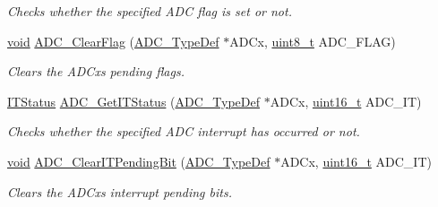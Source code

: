 \begin{DoxyCompactItemize}
\begin{DoxyCompactList}\small\item\em Checks whether the specified A\+DC flag is set or not. \end{DoxyCompactList}\item 
\hyperlink{usb__devapi_8h_afabf60e7f57651d6d595a02c75f07cd0}{void} \hyperlink{group___a_d_c___exported___functions_gaf34f36798f811b4a41321ea2d12118d4}{A\+D\+C\+\_\+\+Clear\+Flag} (\hyperlink{struct_a_d_c___type_def}{A\+D\+C\+\_\+\+Type\+Def} $\ast$A\+D\+Cx, \hyperlink{_p_e___types_8h_aba7bc1797add20fe3efdf37ced1182c5}{uint8\+\_\+t} A\+D\+C\+\_\+\+F\+L\+AG)
\begin{DoxyCompactList}\small\item\em Clears the A\+D\+Cx\textquotesingle{}s pending flags. \end{DoxyCompactList}\item 
\hyperlink{agilefox_2library_2inc_2stm32f10x__type_8h_aacbd7ed539db0aacd973a0f6eca34074}{I\+T\+Status} \hyperlink{group___a_d_c___exported___functions_gaa1d3b910a83dbf14d4f68c8eef058612}{A\+D\+C\+\_\+\+Get\+I\+T\+Status} (\hyperlink{struct_a_d_c___type_def}{A\+D\+C\+\_\+\+Type\+Def} $\ast$A\+D\+Cx, \hyperlink{_p_e___types_8h_a1f1825b69244eb3ad2c7165ddc99c956}{uint16\+\_\+t} A\+D\+C\+\_\+\+IT)
\begin{DoxyCompactList}\small\item\em Checks whether the specified A\+DC interrupt has occurred or not. \end{DoxyCompactList}\item 
\hyperlink{usb__devapi_8h_afabf60e7f57651d6d595a02c75f07cd0}{void} \hyperlink{group___a_d_c___exported___functions_ga601c6a67bd883eb631ecc7aa5e999b9c}{A\+D\+C\+\_\+\+Clear\+I\+T\+Pending\+Bit} (\hyperlink{struct_a_d_c___type_def}{A\+D\+C\+\_\+\+Type\+Def} $\ast$A\+D\+Cx, \hyperlink{_p_e___types_8h_a1f1825b69244eb3ad2c7165ddc99c956}{uint16\+\_\+t} A\+D\+C\+\_\+\+IT)
\begin{DoxyCompactList}\small\item\em Clears the A\+D\+Cx\textquotesingle{}s interrupt pending bits. \end{DoxyCompactList}\end{DoxyCompactItemize}
